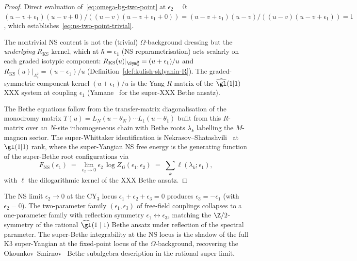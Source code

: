 \begin{proof}
Direct evaluation of~\eqref{eq:omega-bg-two-point} at
$\epsilon_2 = 0$: $(u-v+\epsilon_1)(u-v+0)/((u-v)(u-v+\epsilon_1+0))
= (u-v+\epsilon_1)(u-v)/((u-v)(u-v+\epsilon_1)) = 1$, which
establishes~\eqref{eq:ns-two-point-trivial}.

The nontrivial NS content is not the (trivial) $\Omega$-background
dressing but the \emph{underlying} $R_{\mathrm{KS}}$ kernel, which
at $\hbar = \epsilon_1$ (NS reparametrisation) acts scalarly on
each graded isotypic component:
$R_{\mathrm{KS}}(u)|_{\Sym^2_s} = (u + \epsilon_1)/u$ and
$R_{\mathrm{KS}}(u)|_{\Lambda^2_s} = (u - \epsilon_1)/u$
(Definition~\ref{def:kulish-sklyanin-R}). The graded-symmetric
component kernel $(u+\epsilon_1)/u$ is the Yang $R$-matrix of the
$\widehat{\gl}(1|1)$ XXX system at coupling $\epsilon_1$
(Yamane~\cite{Yamane1999} for the super-XXX Bethe ansatz).

The Bethe equations follow from the transfer-matrix
diagonalisation of the monodromy matrix
$T(u) = L_N(u-\theta_N) \cdots L_1(u-\theta_1)$ built from this
$R$-matrix over an $N$-site inhomogeneous chain with Bethe roots
$\lambda_k$ labelling the $M$-magnon sector. The super-Whittaker
identification is Nekrasov--Shatashvili~\cite{NekrasovShatashvili2009}
at $\gl(1|1)$ rank, where the super-Yangian NS free energy is the
generating function of the super-Bethe root configurations via
\[
 F_{\mathrm{NS}}(\epsilon_1) \;=\;
 \lim_{\epsilon_2 \to 0} \epsilon_2\,\log Z_\Omega(\epsilon_1, \epsilon_2)
 \;=\; \sum_{k} \ell(\lambda_k; \epsilon_1),
\]
with $\ell$ the dilogarithmic kernel of the XXX Bethe ansatz.
\end{proof}

\begin{remark}
\label{rem:ns-k3-integrability}
The NS limit $\epsilon_2 \to 0$ at the CY$_3$ locus
$\epsilon_1 + \epsilon_2 + \epsilon_3 = 0$ produces
$\epsilon_3 = -\epsilon_1$ (with $\epsilon_2 = 0$). The two-parameter
family $(\epsilon_1, \epsilon_3)$ of free-field couplings collapses
to a one-parameter family with reflection symmetry
$\epsilon_1 \leftrightarrow \epsilon_3$, matching the $\Z/2$-symmetry
of the rational $\widehat{\gl}(1 \mid 1)$ Bethe ansatz under
reflection of the spectral parameter. The super-Bethe integrability
at the NS locus is the shadow of the full K3 super-Yangian at the
fixed-point locus of the $\Omega$-background, recovering the
Okounkov--Smirnov~\cite{Smirnov2020} Bethe-subalgebra description in
the rational super-limit.
\end{remark}

